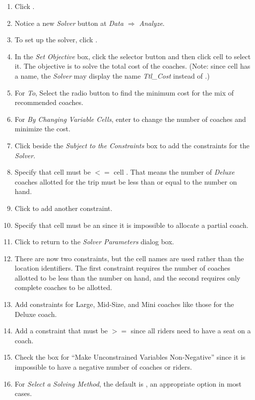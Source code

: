 \begin{enumbox}
\begin{enumerate}
		\item Click .
		\item Notice a new \textit{Solver} button at \textit{Data $ \Rightarrow $ Analyze}.
		\item To set up the solver, click .
		\item In the \textit{Set Objective} box, click the selector button and then click cell  to select it. The objective is to solve the total cost of the coaches. (Note: since cell  has a name, the \textit{Solver}  may display the name \textit{Ttl\_Cost} instead of .)
		\item For \textit{To}, Select the  radio button to find the minimum cost for the mix of recommended coaches.
		\item For \textit{By Changing Variable Cells}, enter  to change the number of coaches and minimize the cost.
		\item Click  beside the \textit{Subject to the Constraints} box to add the constraints for the \textit{Solver}.
		\item Specify that cell  must be $ <= $ cell . That means the number of \textit{Deluxe} coaches allotted for the trip must be less than or equal to the number on hand.
		\item Click  to add another constraint.
		\item Specify that cell  must be an  since it is impossible to allocate a partial coach.
		\item Click  to return to the \textit{Solver Parameters} dialog box. 
		\item There are now two constraints, but the cell names are used rather than the location identifiers. The first constraint requires the number of coaches allotted to be less than the number on hand, and the second requires only complete coaches to be allotted.
		\item Add constraints for Large, Mid-Size, and Mini coaches like those for the Deluxe coach.
		\item Add a constraint that  must be $ >= $  since all riders need to have a seat on a coach.
		\item Check the box for ``Make Unconstrained Variables Non-Negative'' since it is impossible to have a negative number of coaches or riders.
		 \item For \textit{Select a Solving Method}, the default is , an appropriate option in most cases.


\end{enumerate}
\end{enumbox}
